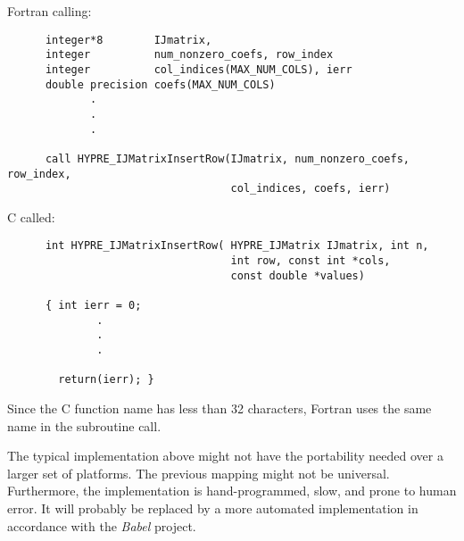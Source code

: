  Fortran calling:
\begin{verbatim}
      integer*8        IJmatrix, 
      integer          num_nonzero_coefs, row_index
      integer          col_indices(MAX_NUM_COLS), ierr
      double precision coefs(MAX_NUM_COLS)
             .
             .
             .

      call HYPRE_IJMatrixInsertRow(IJmatrix, num_nonzero_coefs, row_index,
                                   col_indices, coefs, ierr)
\end{verbatim}

\vspace{0.1in}

  C called:
\begin{verbatim}
      int HYPRE_IJMatrixInsertRow( HYPRE_IJMatrix IJmatrix, int n,
                                   int row, const int *cols,
                                   const double *values)     

      { int ierr = 0;
              .
              .
              .

        return(ierr); }
\end{verbatim}

\noindent Since the C function name has less than 32 characters, Fortran
uses the same name in the subroutine call.

The typical implementation above might not have the portability needed
over a larger set of platforms.  The previous mapping might
not be universal.  Furthermore,
the implementation is hand-programmed, slow, and prone to human error.
It will probably be replaced by a more automated implementation in accordance
with the {\sl Babel} project. 

